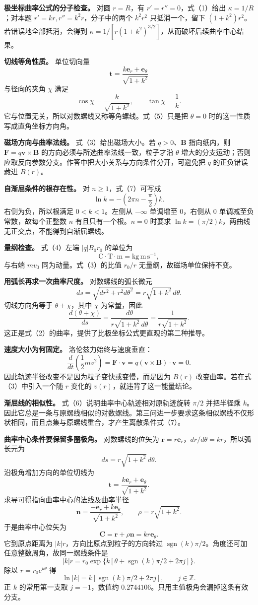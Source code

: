 \documentclass[12pt,a4paper,UTF8]{ctexart}
\begin{document}
\textbf{极坐标曲率公式的分子检查。} 对圆 \(r=R\)，有
\(r'=r''=0\)，式（1）给出 \(\kappa=1/R\)；对本题
\(r'=kr,r''=k^2r\)，分子中的两个 \(k^2r^2\) 只抵消一个，留下
\((1+k^2)r^2\)。若错误地全部抵消，会得到
\(\kappa=1/[r(1+k^2)^{3/2}]\)，从而破坏后续曲率中心结果。

\textbf{切线等角性质。} 单位切向量 \[
\bm t=\frac{k\bm e_r+\bm e_\theta}{\sqrt{1+k^2}}
\] 与径向的夹角 \(\chi\) 满足 \[
\cos\chi=\frac{k}{\sqrt{1+k^2}},
\qquad
\tan\chi=\frac1k.
\] 它与位置无关，所以对数螺线又称等角螺线。式（5）只是把 \(\theta=0\)
时的这一性质写成直角坐标方向角。

\textbf{磁场方向与曲率法线。} 式（3）给出磁场大小。若 \(q>0\)、\(\bm B\)
指向纸内，则 \(\bm F=q\bm v\times\bm B\)
的方向必须与所选曲率法线一致，粒子才沿 \(\theta\)
增大的分支运动；否则应取反向参数分支。作答中把大小关系与方向条件分开，可避免把
\(q\) 的正负错误藏进 \(B(r)\)。

\textbf{自渐屈条件的根存在性。} 对 \(n\ge1\)，式（7）可写成 \[
\ln k=-\left(2\pi n-\frac\pi2\right)k.
\] 右侧为负，所以根满足 \(0<k<1\)。左侧从 \(-\infty\) 单调增至
\(0\)，右侧从 \(0\) 单调减至负常数，故每个正整数 \(n\)
有且只有一个根。\(n=0\) 时要求
\(\ln k=(\pi/2)k\)，两曲线无正交点，不能得到自渐屈螺线。

\textbf{量纲检查。} 式（4）左端 \(|q|B_0r_0\) 的单位为 \[
\mathrm C\cdot\mathrm T\cdot\mathrm m
=\mathrm{kg\,m\,s^{-1}},
\] 与右端 \(mv_0\) 同为动量。式（3）的比值 \(r_0/r\)
无量纲，故磁场单位保持不变。

\textbf{用弧长再求一次曲率尺度。} 对数螺线的弧长微元 \[
ds=\sqrt{dr^2+r^2d\theta^2}
=r\sqrt{1+k^2}\,d\theta.
\] 切线方向角等于 \(\theta+\chi\)，其中 \(\chi\) 为常量，因此 \[
\frac{d(\theta+\chi)}{ds}
=\frac{d\theta}{r\sqrt{1+k^2}\,d\theta}
=\frac1{r\sqrt{1+k^2}}.
\] 这正是式（2）的曲率，提供了比极坐标公式更直观的第二种推导。

\textbf{速度大小为何固定。} 洛伦兹力始终与速度垂直： \[
\frac{d}{dt}\left(\frac12mv^2\right)
=\bm F\cdot\bm v
=q(\bm v\times\bm B)\cdot\bm v=0.
\] 因此轨迹半径改变不是因为粒子变快或变慢，而是因为 \(B(r)\)
改变曲率。若在式（3）中引入一个随 \(r\) 变化的
\(v(r)\)，就违背了这一能量结论。

\textbf{渐屈线的相似性。} 式（6）说明曲率中心轨迹相对原轨迹旋转
\(\pi/2\) 并把半径乘
\(k\)。因此它总是一条与原螺线相似的对数螺线。第三问进一步要求这条相似螺线不仅形状相同，而且点集与原螺线重合，才产生离散条件式（7）。

\textbf{曲率中心条件要保留多圈极角。} 对数螺线的位矢为
\(\bm r=r\bm e_r\)，\(dr/d\theta=kr\)，所以弧长元为 \[
ds=r\sqrt{1+k^2}\,d\theta.
\] 沿极角增加方向的单位切线为 \[
\bm t=\frac{k\bm e_r+\bm e_\theta}{\sqrt{1+k^2}}.
\] 求导可得指向曲率中心的法线及曲率半径 \[
\bm n=\frac{-\bm e_r+k\bm e_\theta}{\sqrt{1+k^2}},\qquad
\rho=r\sqrt{1+k^2}.
\] 于是曲率中心位矢为 \[
\bm C=\bm r+\rho\bm n=kr\bm e_\theta.
\] 它到原点距离为 \(|k|r\)，方向比原点到粒子的方向转过
\(\operatorname{sgn}(k)\pi/2\)。角度还可加任意整数周角，故同一螺线条件是
\[
|k|r=r_0\exp\{k[\theta+\operatorname{sgn}(k)\pi/2+2\pi j]\}.
\] 除以 \(r=r_0e^{k\theta}\) 得 \[
\ln|k|=k[\operatorname{sgn}(k)\pi/2+2\pi j],\qquad j\in\mathbb Z.
\] 正 \(k\) 的常用第一支取 \(j=-1\)，数值约
\(0.2744106\)。只用主值极角会漏掉这条有效分支。
\end{document}
